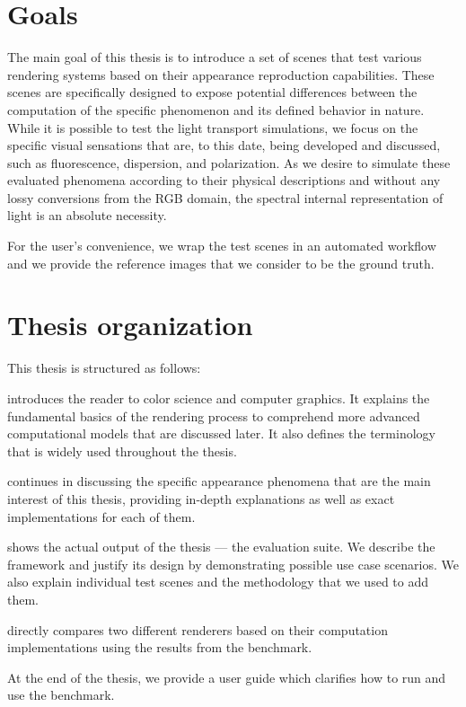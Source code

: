 \section*{Goals}

The main goal of this thesis is to introduce a set of scenes that test various rendering systems based on their appearance reproduction capabilities. These scenes are specifically designed to expose potential differences between the computation of the specific phenomenon and its defined behavior in nature. While it is possible to test the light transport simulations, we focus on the specific visual sensations that are, to this date, being developed and discussed, such as fluorescence, dispersion, and polarization. As we desire to simulate these evaluated phenomena according to their physical descriptions and without any lossy conversions from the RGB domain, the spectral internal representation of light is an absolute necessity.

For the user's convenience, we wrap the test scenes in an automated workflow and we provide the reference images that we consider to be the ground truth.

\section*{Thesis organization}

This thesis is structured as follows: 

 introduces the reader to color science and computer graphics. It explains the fundamental basics of the rendering process to comprehend more advanced computational models that are discussed later. It also defines the terminology that is widely used throughout the thesis.

 continues in discussing the specific appearance phenomena that are the main interest of this thesis, providing in-depth explanations as well as exact implementations for each of them. 

 shows the actual output of the thesis --- the evaluation suite. We describe the framework and justify its design by demonstrating possible use case scenarios. We also explain individual test scenes and the methodology that we used to add them.

 directly compares two different renderers based on their computation implementations using the results from the benchmark.

At the end of the thesis, we provide a user guide which clarifies how to run and use the benchmark.


